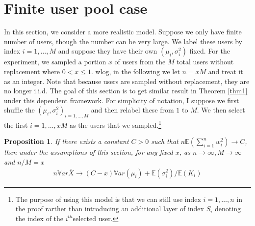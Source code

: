 \documentclass[12pt,letterpaper]{article}
\newcommand{\var}{\ensuremath{\mathbb Var}}
\newcommand{\bbe}{\mathbb{E}}
\newcommand{\xbar}{\overline{X}}
\newtheorem{prop}[thm]{Proposition}
\begin{document}
\section{Finite user pool case}\label{finitecase}
In this section, we consider a more realistic model. Suppose we only have finite number of users, though the number can be very large. We label these users by index $i=1,\dots, M$ and suppose they have their own $(\mu_i,\sigma_i^2)$ fixed. 
For the experiment, we sampled a portion $x$ of users from the $M$ total users without replacement where $0<x\le 1$.  wlog, in the following we let $n = xM$ and treat it as an integer. Note that because users are sampled without replacement, they are no longer i.i.d. 
The goal of this section is to get similar result in Theorem \ref{thm1} under this dependent framework. For simplicity of notation, I suppose we first shuffle the $(\mu_i,\sigma^2_i)_{i=1,\dots,M}$ and then relabel these from $1$ to $M$. We then select the first $i=1,\dots,xM$  as the users that we sampled.\footnote{The purpose of using this model is that we can still use index $i=1,\dots,n$ in the proof rarther than introducing an additional layer of index $S_i$ denoting the index of the $i^{th}$selected user. } 

\begin{prop}\label{prop3}
If there exists a constant $C>0$ such that $n\bbe(\sum_{i=1}^n w_i^2)\to C$, then under the assumptions of this section, for any fixed $x$, as $n\to \infty, M\to \infty$ and $n/M = x$
\begin{align}
 n\var\xbar \to (C-x) \var(\mu_i) + \bbe(\sigma^2_i)/\bbe (K_i) 
\end{align}
\end{prop}
\end{document}
